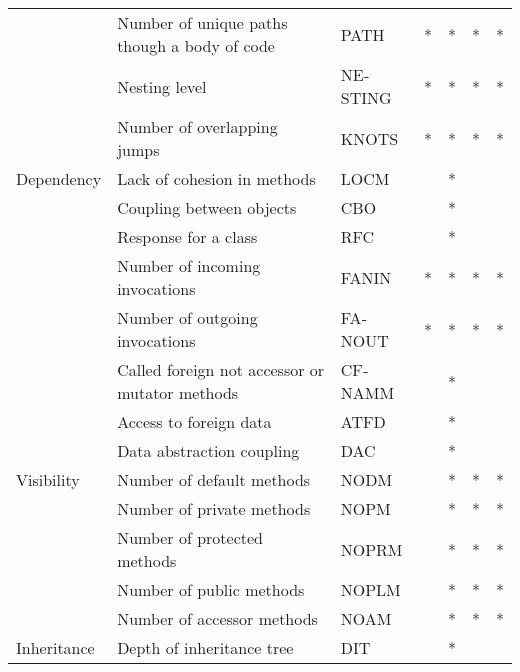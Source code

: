 \begin{table}[]
{\begin{latin}
\begin{tabular}{lllllll}
            & Number of unique paths though a body of   code   & PATH        & *      & *     & *    & *       \\
            & Nesting level                                    & NESTING     & *      & *     & *    & *       \\
            & Number of overlapping jumps                      & KNOTS       & *      & *     & *    & *       \\
            Dependency  & Lack of cohesion in methods                      & LOCM        &        & *     &      &         \\
            & Coupling between   objects                       & CBO         &        & *     &      &         \\
            & Response for a class                             & RFC         &        & *     &      &         \\
            & Number of incoming invocations                   & FANIN       & *      & *     & *    & *       \\
            & Number of outgoing invocations                   & FANOUT      & *      & *     & *    & *       \\
            & Called foreign not   accessor or mutator methods & CFNAMM      &        & *     &      &         \\
            & Access to foreign data                           & ATFD        &        & *     &      &         \\
            & Data abstraction   coupling                      & DAC         &        & *     &      &         \\
            Visibility  & Number of default   methods                      & NODM        &        & *     & *    & *       \\
            & Number of private   methods                      & NOPM        &        & *     & *    & *       \\
            & Number of protected   methods                    & NOPRM       &        & *     & *    & *       \\
            & Number of public   methods                       & NOPLM       &        & *     & *    & *       \\
            & Number of accessor   methods                     & NOAM        &        & *     & *    & *       \\
            Inheritance & Depth of inheritance   tree                      & DIT         &        & *     &      &         \\

\end{tabular}
\end{latin}}
\end{table}
